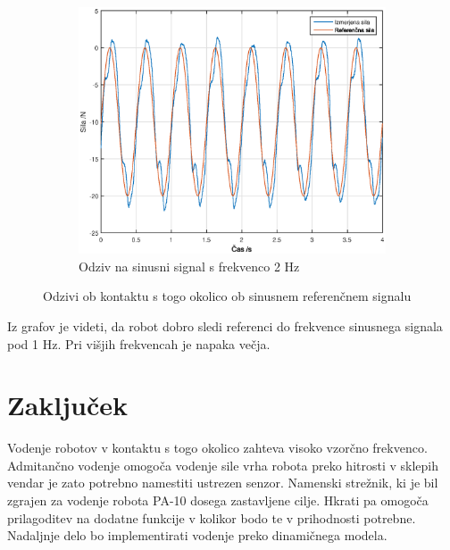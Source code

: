\documentclass[a4paper]{article}
\begin{document}
\begin{figure}[!ht]
	\begin{subfigure}[b]{0.4\textwidth}
		\includegraphics[width=\textwidth]{./slike/figure_20_hz.eps}
		\caption{Odziv na sinusni signal s frekvenco 2 Hz}
	\end{subfigure}
	
	\caption{Odzivi ob kontaktu s togo okolico ob sinusnem referenčnem signalu}
	\label{fig:sineref}
\end{figure}

Iz grafov je videti, da robot dobro sledi referenci do frekvence sinusnega signala pod 1 Hz. Pri višjih frekvencah je napaka večja.

\section{Zaključek}

Vodenje robotov v kontaktu s togo okolico zahteva visoko vzorčno frekvenco. Admitančno vodenje omogoča vodenje sile vrha robota preko hitrosti v sklepih vendar je zato potrebno namestiti ustrezen senzor. Namenski strežnik, ki je bil zgrajen za vodenje robota PA-10 dosega zastavljene cilje. Hkrati pa omogoča prilagoditev na dodatne funkcije v kolikor bodo te v prihodnosti potrebne. Nadaljnje delo bo implementirati vodenje preko dinamičnega modela. 

\small



%
%
%
%

	
\end{document}
